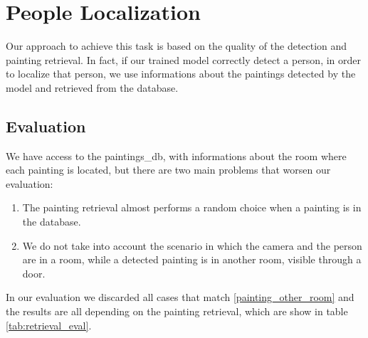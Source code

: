 \section{People Localization}
Our approach to achieve this task is based on the quality of the detection and painting retrieval. In fact, if our trained model correctly detect a person, in order to localize that person, we use informations about the paintings detected by the model and retrieved from the database.

\subsection{Evaluation}
We have access to the paintings\_db, with informations about the room where each painting is located, but there are two main problems that worsen our evaluation:

\begin{enumerate}[label=\alph*)]
	\item \label{retrieval_case} The painting retrieval almost performs a random choice when a painting is in the database.
    \item \label{painting_other_room} We do not take into account the scenario in which the camera and the person are in a room, while a detected painting is in another room, visible through a door.
\end{enumerate}

In our evaluation we discarded all cases that match \ref*{painting_other_room} and the results are all depending on the painting retrieval, which are show in table \ref*{tab:retrieval_eval}.